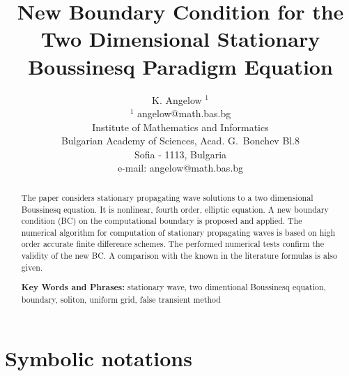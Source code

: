 \documentclass[12pt]{article}
\theoremstyle{theorem}
\theoremstyle{defi}
\begin{document}

\title{New Boundary Condition for the Two Dimensional Stationary Boussinesq Paradigm Equation}

\author{K. Angelow $^1$ \\[6pt]
$^1$ angelow@math.bas.bg\\ 
Institute of Mathematics and Informatics\\
Bulgarian Academy of Sciences, Acad. G.~Bonchev Bl.8\\
Sofia - 1113, Bulgaria\\
e-mail: angelow@math.bas.bg\\[6pt] }

\maketitle

\begin{abstract}

The paper considers stationary propagating wave solutions to a two dimensional Boussinesq equation. It is nonlinear, fourth order, elliptic equation. A new boundary condition (BC) on the computational boundary is proposed and applied. The numerical algorithm for computation of stationary propagating waves is based on high order accurate finite difference schemes. The performed numerical tests confirm the validity of the new BC. A comparison with the known in the literature formulas is also given.

\medskip


{\bf Key Words and Phrases:} stationary wave, two dimentional Boussinesq equation, boundary, soliton, uniform grid, false transient method

\end{abstract}

\section{Symbolic notations}
\end{document}
